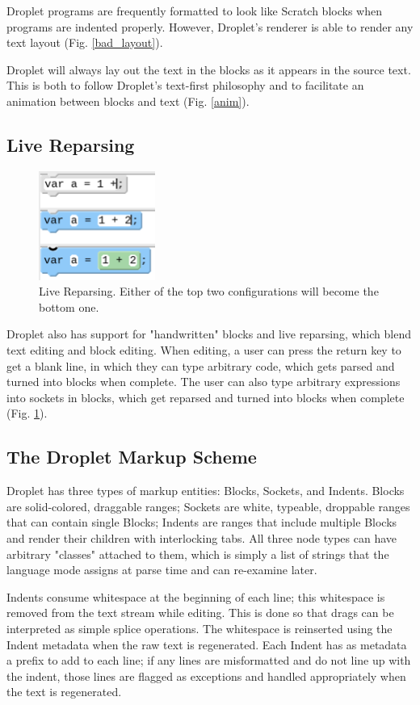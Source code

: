 \documentclass[conference]{IEEEtran}
\begin{document}
Droplet programs are frequently formatted to look like Scratch blocks when programs are indented properly. However, Droplet's renderer is able to render any text layout (Fig. \ref{bad_layout}).

Droplet will always lay out the text in the blocks as it appears in the source text. This is both to follow Droplet's text-first philosophy and to facilitate an animation between blocks and text (Fig. \ref{anim}).

\subsection{Live Reparsing}

\begin{figure}[!t]
\centering
\includegraphics[width=1.5in]{livereparse.png}
\caption{Live Reparsing. Either of the top two configurations will become the bottom one.}
\label{livereparse}
\end{figure}

Droplet also has support for "handwritten" blocks and live reparsing, which blend text editing and block editing. When editing, a user can press the return key to get a blank line, in which they can type arbitrary code, which gets parsed and turned into blocks when complete. The user can also type arbitrary expressions into sockets in blocks, which get reparsed and turned into blocks when complete (Fig. \ref{livereparse}).

\subsection{The Droplet Markup Scheme}
Droplet has three types of markup entities: Blocks, Sockets, and Indents. Blocks are solid-colored, draggable ranges; Sockets are white, typeable, droppable ranges that can contain single Blocks; Indents are ranges that include multiple Blocks and render their children with interlocking tabs. All three node types can have arbitrary "classes" attached to them, which is simply a list of strings that the language mode assigns at parse time and can re-examine later.

Indents consume whitespace at the beginning of each line; this whitespace is removed from the text stream while editing. This is done so that drags can be interpreted as simple splice operations. The whitespace is reinserted using the Indent metadata when the raw text is regenerated. Each Indent has as metadata a prefix to add to each line; if any lines are misformatted and do not line up with the indent, those lines are flagged as exceptions and handled appropriately when the text is regenerated.
\end{document}
